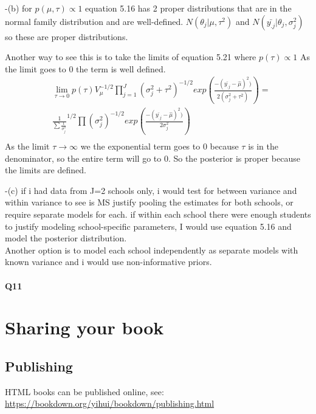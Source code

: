 \documentclass[
]{book}
\theoremstyle{definition}
\theoremstyle{definition}
\theoremstyle{definition}
\theoremstyle{definition}
\theoremstyle{remark}
\begin{document}
-(b) for \(p(\mu,\tau)\propto 1\) equation 5.16 has 2 proper distributions that are in the normal family distribution and are well-defined. \(N(\theta_j | \mu,\tau^2)\) and \(N(\bar{y_{.j}} | \theta_j, \sigma_j^2)\) so these are proper distributions.

Another way to see this is to take the limits of equation 5.21 where \(p(\tau)\propto 1\) As the limit goes to 0 the term is well defined.
\[
\begin{aligned}
& \lim_{\tau \to 0} p(\tau)V_{\mu}^{-1/2}\prod_{j=1}^J(\sigma_j^2+\tau^2)^{-1/2}exp(\frac{-(\bar{y_{.j}}-\hat{\mu})^2)}{2(\sigma_j^2+\tau^2)}) = \\
& \frac{1}{\sum \frac{1}{\sigma_j^2}}^{1/2}\prod (\sigma_j^2)^{-1/2}exp(\frac{-(\bar{y_{.j}}-\hat{\mu})^2)}{2\sigma_j^2}) \\
\end{aligned}
\]
As the limit \(\tau \to \infty\) we the exponential term goes to 0 because \(\tau\) is in the denominator, so the entire term will go to 0. So the posterior is proper because the limits are defined.

-(c) if i had data from J=2 schools only, i would test for between variance and within variance to see is MS justify pooling the estimates for both schools, or require separate models for each. if within each school there were enough students to justify modeling school-specific parameters, I would use equation 5.16 and model the posterior distribution.\\
Another option is to model each school independently as separate models with known variance and i would use non-informative priors.

\hypertarget{q11}{%
\subsubsection*{Q11}\label{q11}}

\hypertarget{sharing-your-book}{%
\chapter{Sharing your book}\label{sharing-your-book}}

\hypertarget{publishing}{%
\section{Publishing}\label{publishing}}

HTML books can be published online, see: \url{https://bookdown.org/yihui/bookdown/publishing.html}
\end{document}
